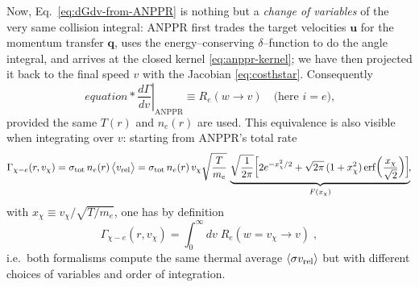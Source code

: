 \documentclass[13.1pt, letterpaper, twoside]{article}
\begin{document}
Now, Eq.~\eqref{eq:dGdv-from-ANPPR} is nothing but a \emph{change of variables} of the very same collision integral: ANPPR first trades the target velocities $\mathbf u$ for the momentum transfer $\mathbf q$, uses the energy–conserving $\delta$–function to do the angle integral, and arrives at the closed kernel \eqref{eq:anppr-kernel}; we have then projected it back to the final speed $v$ with the Jacobian \eqref{eq:costhstar}. Consequently
\begin{equation}[box=\fbox]{equation*}
    \left.\frac{d\Gamma}{dv}\right|_{\text{ANPPR}}
    \equiv R_e(w\!\to\! v)\quad\text{(here $i=e$),}
\end{equation}
provided the same $T(r)$ and $n_e(r)$ are used. This equivalence is also visible when integrating over $v$: starting from ANPPR’s total rate
\begin{equation}
    \label{eq:Gamma-total}
    \Gamma_{\chi-e}(r,v_\chi)
    =\sigma_{\rm tot}\,n_e(r)\,\big\langle v_{\rm rel}\big\rangle
    =\sigma_{\rm tot}\,n_e(r)\,v_\chi\sqrt{\frac{T}{m_e}}\,
    \underbrace{\sqrt{\frac{1}{2\pi}}\!\left[2e^{-x_\chi^2/2}
    +\sqrt{2\pi}\,(1+x_\chi^2)\,\mathrm{erf}\!\left(\frac{x_\chi}{\sqrt2}\right)\right]}_{F(x_\chi)}
    \!,
\end{equation}
with $x_\chi\equiv v_\chi/\sqrt{T/m_e}$, one has by definition
\begin{equation}
    \Gamma_{\chi-e}(r,v_\chi)=\int_0^\infty\!dv\;R_e(w\!=\!v_\chi\!\to\! v)\;,
\end{equation}
i.e.\ both formalisms compute the same thermal average $\langle\sigma v_{\rm rel}\rangle$ but with different choices of variables and order of integration.
\end{document}
